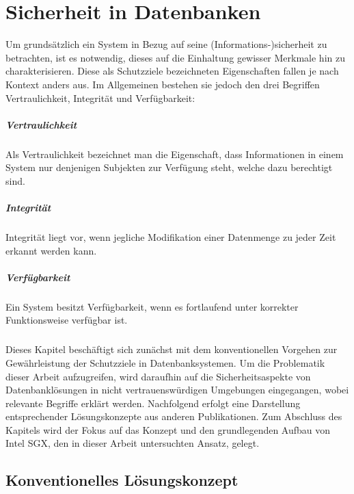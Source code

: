 
\chapter{Sicherheit in Datenbanken}

Um grundsätzlich ein System in Bezug auf seine (Informations-)sicherheit zu betrachten, ist es notwendig, dieses auf die Einhaltung gewisser Merkmale hin zu charakterisieren. Diese als Schutzziele bezeichneten Eigenschaften fallen je nach Kontext anders aus. Im Allgemeinen bestehen sie jedoch den drei Begriffen Vertraulichkeit, Integrität und Verfügbarkeit:

\paragraph{Vertraulichkeit}
Als Vertraulichkeit bezeichnet man die Eigenschaft, dass Informationen in einem System nur denjenigen Subjekten zur Verfügung steht, welche dazu berechtigt sind.

\paragraph{Integrität}
Integrität liegt vor, wenn jegliche Modifikation einer Datenmenge zu jeder Zeit erkannt werden kann.

\paragraph{Verfügbarkeit}
Ein System besitzt Verfügbarkeit, wenn es fortlaufend unter korrekter Funktionsweise verfügbar ist.

\paragraph{}
Dieses Kapitel beschäftigt sich zunächst mit dem konventionellen Vorgehen zur Gewährleistung der Schutzziele in Datenbanksystemen. Um die Problematik dieser Arbeit aufzugreifen, wird daraufhin auf die Sicherheitsaspekte von Datenbanklösungen in nicht vertrauenswürdigen Umgebungen eingegangen, wobei relevante Begriffe erklärt werden. Nachfolgend erfolgt eine Darstellung entsprechender Lösungskonzepte aus anderen Publikationen. Zum Abschluss des Kapitels wird der Fokus auf das Konzept und den grundlegenden Aufbau von Intel SGX, den in dieser Arbeit untersuchten Ansatz, gelegt.

\section{Konventionelles Lösungskonzept}


